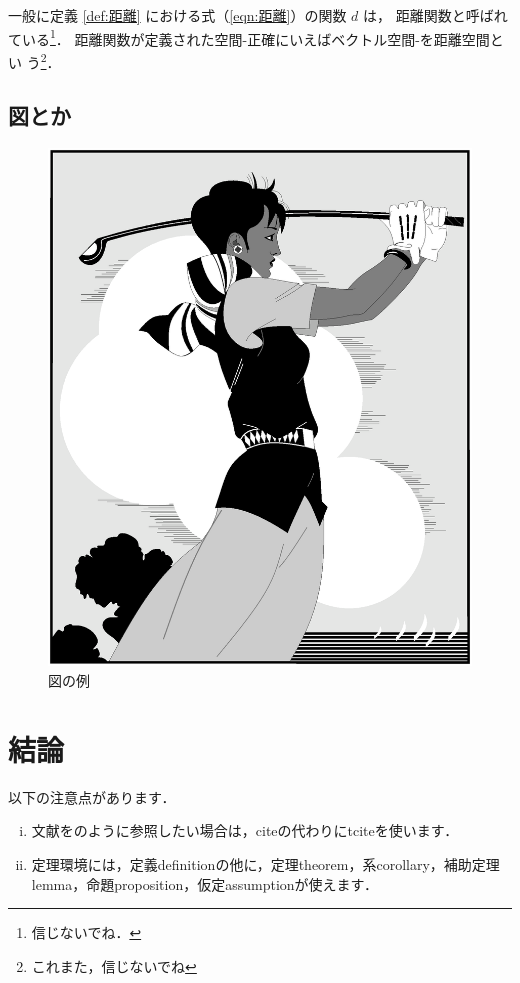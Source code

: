 \documentclass{thesis}
\begin{document}
一般に定義 \ref{def:距離} における式（\ref{eqn:距離}）の関数 $d$ は，
距離関数と呼ばれている\footnote{信じないでね．}．
距離関数が定義された空間{\--}正確にいえばベクトル空間{\--}を距離空間とい
う\footnote{これまた，信じないでね}．

\section{図とか}

\begin{figure}[H]
 \center
 \includegraphics[scale=0.3]{./golfer.eps}
 \caption{図の例}
\end{figure}

\chapter{結論}

以下の注意点があります．

\begin{enumerate}[(i)]
\item 文献をのように参照したい場合は，citeの代わりにtciteを使います．
\item 定理環境には，定義definitionの他に，定理theorem，系corollary，補助定理lemma，命題proposition，仮定assumptionが使えます．
\end{enumerate}
\end{document}
